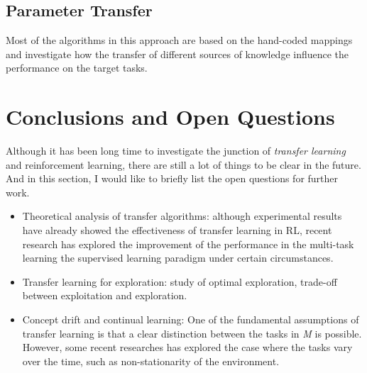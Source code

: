 \documentclass{article}
\begin{document}
\subsection{Parameter Transfer}
Most of the algorithms in this approach are based on the hand-coded mappings and investigate how the transfer of different sources of knowledge influence the performance on the target tasks.

\section{Conclusions and Open Questions}
Although it has been long time to investigate the junction of \textit{transfer learning} and reinforcement learning, there are still a lot of things to be clear in the future. And in this section, I would like to briefly list the open questions for further work.

\begin{itemize}
    \item Theoretical analysis of transfer algorithms: although experimental results have already showed the effectiveness of transfer learning in RL, recent research has explored the improvement of the performance in the multi-task learning the supervised learning paradigm under certain circumstances.
    \item Transfer learning for exploration: study of optimal exploration, trade-off between exploitation and exploration.
    \item Concept drift and continual learning: One of the fundamental assumptions of transfer learning is that a clear distinction between the tasks in \textit{M} is possible. However, some recent researches has explored the case where the tasks vary over the time, such as non-stationarity of the environment.
\end{itemize}

\medskip
\printbibliography
\end{document}
